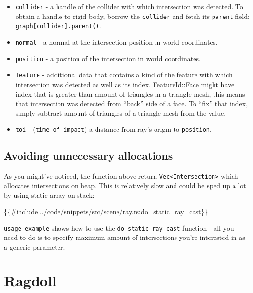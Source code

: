 \documentclass[
]{book}
\newenvironment{Shaded}{\begin{snugshade}}{\end{snugshade}}
\newcommand{\NormalTok}[1]{#1}
\providecommand{\tightlist}{%
  \setlength{\itemsep}{0pt}\setlength{\parskip}{0pt}}
\theoremstyle{definition}
\theoremstyle{definition}
\theoremstyle{definition}
\theoremstyle{definition}
\theoremstyle{remark}
\begin{document}
\begin{itemize}
\tightlist
\item
  \texttt{collider} - a handle of the collider with which intersection was detected. To obtain a handle to rigid body, borrow the \texttt{collider} and fetch its \texttt{parent} field: \texttt{graph{[}collider{]}.parent()}.
\item
  \texttt{normal} - a normal at the intersection position in world coordinates.
\item
  \texttt{position} - a position of the intersection in world coordinates.
\item
  \texttt{feature} - additional data that contains a kind of the feature with which intersection was detected as well as its index. FeatureId::Face might have index that is greater than amount of triangles in a triangle mesh, this means that intersection was detected from ``back'' side of a face. To ``fix'' that index, simply subtract amount of triangles of a triangle mesh from the value.
\item
  \texttt{toi} - (\texttt{time\ of\ impact}) a distance from ray's origin to \texttt{position}.
\end{itemize}

\subsection{Avoiding unnecessary allocations}\label{avoiding-unnecessary-allocations}

As you might've noticed, the function above return \texttt{Vec\textless{}Intersection\textgreater{}} which allocates intersections on heap. This is relatively slow and could be sped up a lot by using static array on stack:

\begin{Shaded}
\begin{Highlighting}[]
\NormalTok{\{\{\#include ../code/snippets/src/scene/ray.rs:do\_static\_ray\_cast\}\}}
\end{Highlighting}
\end{Shaded}

\texttt{usage\_example} shows how to use the \texttt{do\_static\_ray\_cast} function - all you need to do is to specify maximum amount of intersections you're interested in as a generic parameter.

\section{Ragdoll}\label{ragdoll}
\end{document}
